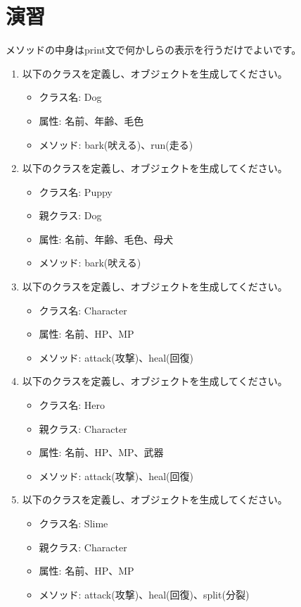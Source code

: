 \documentclass[a4paper,titlepage,dvipdfmx]{jarticle}
\begin{document}
\section{演習}
メソッドの中身はprint文で何かしらの表示を行うだけでよいです。
\begin{enumerate}
  \item 以下のクラスを定義し、オブジェクトを生成してください。
        \begin{itemize}
          \item クラス名: Dog
          \item 属性: 名前、年齢、毛色
          \item メソッド: bark(吠える)、run(走る)
        \end{itemize}
  \item 以下のクラスを定義し、オブジェクトを生成してください。
        \begin{itemize}
          \item クラス名: Puppy
          \item 親クラス: Dog
          \item 属性: 名前、年齢、毛色、母犬
          \item メソッド: bark(吠える)
        \end{itemize}
  \item 以下のクラスを定義し、オブジェクトを生成してください。
        \begin{itemize}
          \item クラス名: Character
          \item 属性: 名前、HP、MP
          \item メソッド: attack(攻撃)、heal(回復)
        \end{itemize}
  \item 以下のクラスを定義し、オブジェクトを生成してください。
        \begin{itemize}
          \item クラス名: Hero
          \item 親クラス: Character
          \item 属性: 名前、HP、MP、武器
          \item メソッド: attack(攻撃)、heal(回復)
        \end{itemize}
  \item 以下のクラスを定義し、オブジェクトを生成してください。
        \begin{itemize}
          \item クラス名: Slime
          \item 親クラス: Character
          \item 属性: 名前、HP、MP
          \item メソッド: attack(攻撃)、heal(回復)、split(分裂)
        \end{itemize}
\end{enumerate}
\end{document}
